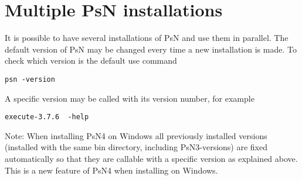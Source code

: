 \section{Multiple PsN installations}
It is possible to have several installations of PsN and use them in parallel. 
The default version of PsN may be changed every time a new installation is made. 
To check which version is the default use command
\begin{verbatim}
psn -version
\end{verbatim}

\noindent A specific version may be called with its version number, for example

\begin{verbatim}
execute-3.7.6  -help 
\end{verbatim}

\noindent Note: When installing PsN4 on Windows all previously installed versions 
(installed with the same bin directory,
including PsN3-versions) are fixed automatically so that they are callable with a specific version as 
explained above. This is a new feature of PsN4 when installing on Windows.


